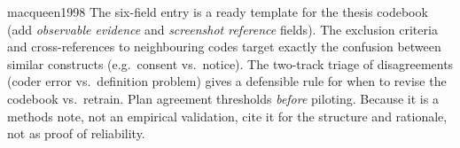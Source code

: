 \begin{papercard}{macqueen1998}
 The six-field entry is a ready template for the thesis codebook (add \emph{observable evidence} and \emph{screenshot reference} fields). The exclusion criteria and cross-references to neighbouring codes target exactly the confusion between similar constructs (e.g.\ consent vs.\ notice). The two-track triage of disagreements (coder error vs.\ definition problem) gives a defensible rule for when to revise the codebook vs.\ retrain. Plan agreement thresholds \emph{before} piloting. Because it is a methods note, not an empirical validation, cite it for the structure and rationale, not as proof of reliability.
\end{papercard}
